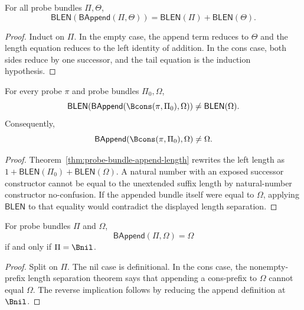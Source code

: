 \begin{theorem}
\label{thm:probe-bundle-append-length}
For all probe bundles $\Pi,\Theta$,
$$
\mathsf{BLEN}(\mathsf{BAppend}(\Pi,\Theta))=\mathsf{BLEN}(\Pi)+\mathsf{BLEN}(\Theta).
$$
\end{theorem}
\begin{proof}
Induct on $\Pi$. In the empty case, the append term reduces to $\Theta$ and the length equation reduces to the left identity of addition. In the cons case, both sides reduce by one successor, and the tail equation is the induction hypothesis.
\end{proof}

\begin{lemma}
\label{lem:probe-bundle-nonempty-prefix-length-separation}
For every probe $\pi$ and probe bundles $\Pi_0,\Omega$,
$$
\mathsf{BLEN}(\mathsf{BAppend}(\Bcons(\pi,\Pi_0),\Omega))
\neq
\mathsf{BLEN}(\Omega).
$$
Consequently,
$$
\mathsf{BAppend}(\Bcons(\pi,\Pi_0),\Omega)\neq\Omega.
$$
\end{lemma}
\begin{proof}
Theorem~\ref{thm:probe-bundle-append-length} rewrites the left length as
$1+\mathsf{BLEN}(\Pi_0)+\mathsf{BLEN}(\Omega)$. A natural number with an exposed successor constructor cannot be equal to the unextended suffix length by natural-number constructor no-confusion. If the appended bundle itself were equal to $\Omega$, applying $\mathsf{BLEN}$ to that equality would contradict the displayed length separation.
\end{proof}

\begin{theorem}
\label{thm:bundle-append-eq-right-iff-left-nil}
For probe bundles $\Pi$ and $\Omega$,
$$
\mathsf{BAppend}(\Pi,\Omega)=\Omega
$$
if and only if $\Pi=\Bnil$.
\end{theorem}
\begin{proof}
Split on $\Pi$. The nil case is definitional. In the cons case, the
nonempty-prefix length separation theorem says that appending a cons-prefix to
$\Omega$ cannot equal $\Omega$. The reverse implication follows by reducing
the append definition at $\Bnil$.
\end{proof}

